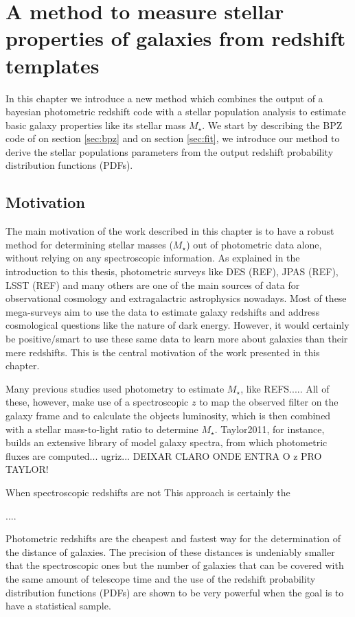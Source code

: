 \documentclass[9pt]{memoir}
\begin{document}
\chapter{A method to measure stellar properties of galaxies from redshift templates}



In this chapter we introduce a new method which combines the output of a bayesian  photometric redshift code with a stellar population analysis to estimate basic galaxy properties like its stellar mass $M_\star$.
We start by describing the BPZ code of \cite{Benitez.2000a} on section \ref{sec:bpz} and on section \ref{sec:fit}, we introduce our method to derive the stellar populations parameters from the output redshift probability distribution functions (PDFs).


\section{Motivation}
\label{sec:motivation}

The main motivation of the work described in this chapter is to have a robust method for determining stellar masses ($M_\star$) out of photometric data alone, without relying on any spectroscopic information. As explained in the introduction to this thesis, photometric surveys like DES (REF), JPAS (REF), LSST (REF) and many others are one of the main sources of data for observational cosmology and extragalactric astrophysics nowadays. Most of these mega-surveys aim to use the data to estimate galaxy redshifts and address cosmological questions like the nature of dark energy. However, it would certainly be positive/smart to use these same data to learn more about galaxies than their mere redshifts. This is the central motivation of the work presented in this chapter.


Many previous studies used photometry to estimate $M_\star$, like REFS.....
All of these, however, make use of a spectroscopic $z$ to map the observed filter on the galaxy frame and to calculate the objects luminosity, which is then combined with a stellar mass-to-light ratio to determine $M_\star$. Taylor2011, for instance, builds an extensive library of model galaxy spectra, from which photometric fluxes are computed... ugriz... DEIXAR CLARO ONDE ENTRA O z PRO TAYLOR!


When spectroscopic redshifts are not This approach is certainly the 

....


Photometric redshifts are the cheapest and fastest way for the determination of the distance of galaxies. The precision of these distances is undeniably smaller that the spectroscopic ones but the number of galaxies that can be covered with the same amount of telescope time and the use of the redshift probability distribution functions (PDFs) are shown to be very powerful when the goal is to have a statistical sample.
\end{document}
